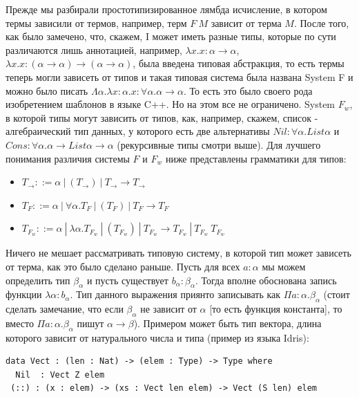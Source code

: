 \documentclass[12pt]{article}
\begin{document}
Прежде мы разбирали простотипизированное лямбда исчисление, в котором термы зависили от термов, например, терм $F\ M$ зависит от терма $M$. После того, как было замечено, что, скажем, I может иметь разные типы, которые по сути различаются лишь аннотацией, например, $\lambda x. x : \alpha \rightarrow \alpha$, $\lambda x. x : (\alpha \rightarrow \alpha) \rightarrow (\alpha \rightarrow \alpha)$, была введена типовая абстракция, то есть термы теперь могли зависеть от типов и такая типовая система была названа System F и можно было писать $\Lambda \alpha. \lambda x : \alpha . x : \forall \alpha. \alpha \rightarrow \alpha$. То есть это было своего рода изобретением шаблонов в языке C++. Но на этом все не ограничено. System $F_w$, в которой типы могут зависить от типов, как, например, скажем, список - алгебраический тип данных, у которого есть две альтернативы $Nil : \forall \alpha . List \alpha$ и $Cons : \forall \alpha. \alpha \rightarrow List \alpha \rightarrow \alpha$ (рекурсивные типы смотри выше). Для лучшего понимания различия системы $F$ и $F_w$ ниже представлены грамматики для типов:
\begin{itemize}
    \item $T_\rightarrow ::= \alpha\ |\ (T_\rightarrow)\ |\ T_\rightarrow \rightarrow T_\rightarrow$
    \item $T_F ::= \alpha\ |\ \forall \alpha. T_F\ |\ (T_F)\ |\ T_F \rightarrow T_F$ 
    \item $T_{F_w} ::= \alpha\ |\ \lambda \alpha. T_{F_w}\ |\ (T_{F_w})\ |\ T_{F_w} \rightarrow T_{F_w}\ |\ T_{F_w}\ T_{F_w} $
\end{itemize}

Ничего не мешает рассматривать типовую систему, в которой тип может зависеть от терма, как это было сделано раньше. Пусть для всех $a : \alpha$ мы можем определить тип $\beta_\alpha$ и пусть существует $b_\alpha : \beta_\alpha$. Тогда вполне обоснована запись функции $\lambda \alpha : b_\alpha$. Тип данного выражения приянто записывать как $\Pi a :\alpha . \beta_\alpha$ (стоит сделать замечание, что если $\beta_\alpha$ не зависит от $\alpha$ [то есть функция константа], то вместо $\Pi a :\alpha . \beta_\alpha$ пишут $\alpha \rightarrow \beta$). Примером может быть тип вектора, длина которого зависит от натурального числа и типа (пример из языка Idris):
\begin{verbatim}
data Vect : (len : Nat) -> (elem : Type) -> Type where
  Nil  : Vect Z elem
 (::) : (x : elem) -> (xs : Vect len elem) -> Vect (S len) elem
\end{verbatim}
\end{document}
